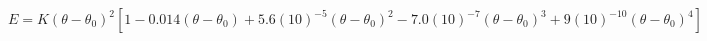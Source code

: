 \documentclass[12pt]{article}
\begin{document}
\thispagestyle{empty}
$$
  E = K (\theta - \theta_0)^2 \left[ 1 - 0.014(\theta - \theta_0) + 5.6(10)^{-5} (\theta - \theta_0)^2 - 7.0(10)^{-7} (\theta - \theta_0)^3 + 9(10)^{-10} (\theta - \theta_0)^4 \right]
$$
\end{document}
